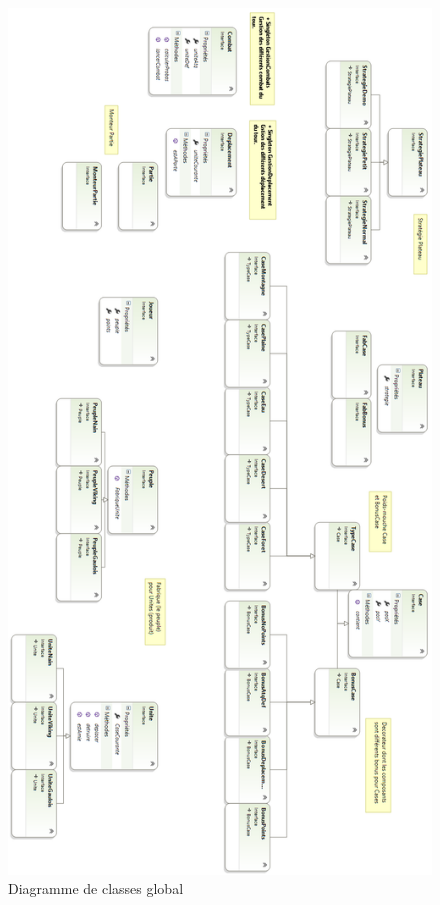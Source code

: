 \documentclass[a4paper]{article}%
\begin{document}
\begin{figure}[H]
    \includegraphics[width=\textwidth, height=\textheight]{./images/class/interfacesPortrait.png}
                \caption{Diagramme de classes global}
                \label{fig:class_global}
\end{figure}
\end{document}
